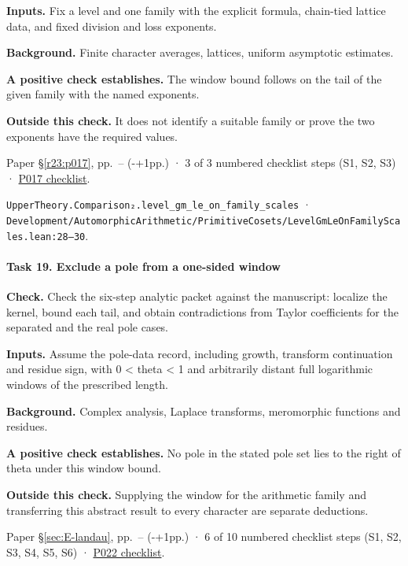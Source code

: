 \textbf{Inputs.} Fix a level and one family with the explicit formula, chain-tied lattice data, and fixed division and loss exponents.

\textbf{Background.} Finite character averages, lattices, uniform asymptotic estimates.

\textbf{A positive check establishes.} The window bound follows on the tail of the given family with the named exponents.

\textbf{Outside this check.} It does not identify a suitable family or prove the two exponents have the required values.

Paper \S\ref{r23:p017}, pp.\ \pageref{r23:family}--\pageref{r23:budget} (\number\numexpr{}-+1\relax pp.) · 3 of 3 numbered checklist steps (S1, S2, S3) · \href{https://github.com/GunheeC/rh-lean-verification-atlas/blob/v0.1.0/units/P017.check.md}{P017 checklist}.

\nolinkurl{UpperTheory.Comparison₂.level_gm_le_on_family_scales} · \nolinkurl{Development/AutomorphicArithmetic/PrimitiveCosets/LevelGmLeOnFamilyScales.lean:28–30}.

\paragraph{Task 19. Exclude a pole from a one-sided window}\label{v7:task-19}

\textbf{Check.} Check the six-step analytic packet against the manuscript: localize the kernel, bound each tail, and obtain contradictions from Taylor coefficients for the separated and the real pole cases.

\textbf{Inputs.} Assume the pole-data record, including growth, transform continuation and residue sign, with 0 < theta < 1 and arbitrarily distant full logarithmic windows of the prescribed length.

\textbf{Background.} Complex analysis, Laplace transforms, meromorphic functions and residues.

\textbf{A positive check establishes.} No pole in the stated pole set lies to the right of theta under this window bound.

\textbf{Outside this check.} Supplying the window for the arithmetic family and transferring this abstract result to every character are separate deductions.

Paper \S\ref{sec:E-landau}, pp.\ \pageref{sec:E-landau}--\pageref{rem:E-landau-compare} (\number\numexpr{}-+1\relax pp.) · 6 of 10 numbered checklist steps (S1, S2, S3, S4, S5, S6) · \href{https://github.com/GunheeC/rh-lean-verification-atlas/blob/v0.1.0/units/P022.check.md}{P022 checklist}.

